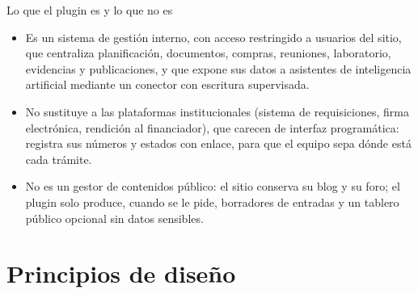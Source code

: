 \documentclass[11pt,a4paper]{article}
\begin{document}
\begin{caja}{Lo que el plugin es y lo que no es}
\begin{itemize}
\item Es un sistema de gestión interno, con acceso restringido a usuarios del sitio, que centraliza planificación, documentos, compras, reuniones, laboratorio, evidencias y publicaciones, y que expone sus datos a asistentes de inteligencia artificial mediante un conector con escritura supervisada.
\item No sustituye a las plataformas institucionales (sistema de requisiciones, firma electrónica, rendición al financiador), que carecen de interfaz programática: registra sus números y estados con enlace, para que el equipo sepa dónde está cada trámite.
\item No es un gestor de contenidos público: el sitio conserva su blog y su foro; el plugin solo produce, cuando se le pide, borradores de entradas y un tablero público opcional sin datos sensibles.
\end{itemize}
\end{caja}

\section{Principios de diseño}
\end{document}
